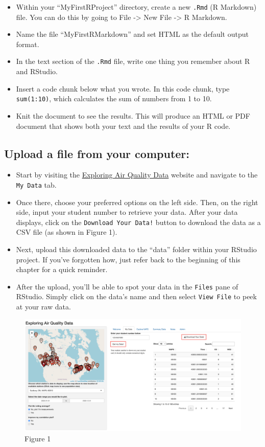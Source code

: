 \documentclass[
]{book}
\providecommand{\tightlist}{%
  \setlength{\itemsep}{0pt}\setlength{\parskip}{0pt}}
\begin{document}
\begin{itemize}
\tightlist
\item
  Within your ``MyFirstRProject'' directory, create a new \texttt{.Rmd} (R Markdown) file. You can do this by going to File -\textgreater{} New File -\textgreater{} R Markdown.
\item
  Name the file ``MyFirstRMarkdown'' and set HTML as the default output format.
\item
  In the text section of the \texttt{.Rmd} file, write one thing you remember about R and RStudio.
\item
  Insert a code chunk below what you wrote. In this code chunk, type \texttt{sum(1:10)}, which calculates the sum of numbers from 1 to 10.
\item
  Knit the document to see the results. This will produce an HTML or PDF document that shows both your text and the results of your R code.
\end{itemize}

\hypertarget{upload-a-file-from-your-computer}{%
\subsection{Upload a file from your computer:}\label{upload-a-file-from-your-computer}}

\begin{itemize}
\tightlist
\item
  Start by visiting the \href{https://uoft-chem.shinyapps.io/Air_Quality_App/}{Exploring Air Quality Data} website and navigate to the \texttt{My\ Data} tab.
\item
  Once there, choose your preferred options on the left side. Then, on the right side, input your student number to retrieve your data. After your data displays, click on the \texttt{Download\ Your\ Data!} button to download the data as a CSV file (as shown in Figure 1).
\item
  Next, upload this downloaded data to the ``data'' folder within your RStudio project. If you've forgotten how, just refer back to the beginning of this chapter for a quick reminder.
\item
  After the upload, you'll be able to spot your data in the \texttt{Files} pane of RStudio. Simply click on the data's name and then select \texttt{View\ File} to peek at your raw data.
\end{itemize}

\begin{figure}
\centering
\includegraphics{images/shinyapp.png}
\caption{Figure 1}
\end{figure}
\end{document}
